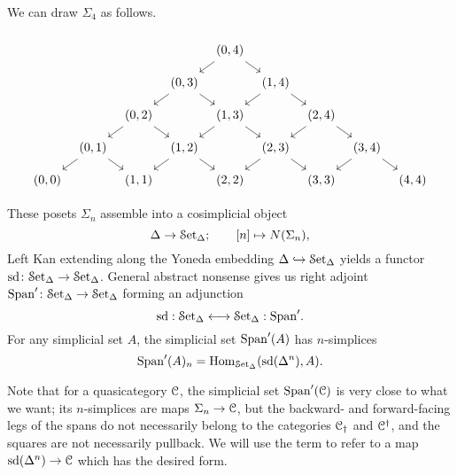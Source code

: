 \documentclass[main.tex]{subfiles}
\begin{document}
\begin{example}
  \label{eg:sigma_4}
  We can draw $\Sigma_{4}$ as follows.
  \begin{equation*}
    \begin{tikzcd}[column sep=tiny, row sep=small]
      \\
      &&&& {(0, 4)}
      \arrow[dl]
      \arrow[dr]
      \\
      &&& {(0, 3)}
      \arrow[dl]
      \arrow[dr]
      && {(1, 4)}
      \arrow[dl]
      \arrow[dr]
      \\
      && {(0, 2)}
      \arrow[dl]
      \arrow[dr]
      && {(1, 3)}
      \arrow[dl]
      \arrow[dr]
      && {(2, 4)}
      \arrow[dl]
      \arrow[dr]
      \\
      & {(0, 1)}
      \arrow[dl]
      \arrow[dr]
      && {(1, 2)}
      \arrow[dl]
      \arrow[dr]
      && {(2, 3)}
      \arrow[dl]
      \arrow[dr]
      && {(3, 4)}
      \arrow[dl]
      \arrow[dr]
      \\
      {(0, 0)}
      && {(1, 1)}
      && {(2, 2)}
      && {(3, 3)}
      && {(4, 4)}
    \end{tikzcd}
  \end{equation*}
\end{example}

These posets $\Sigma_{n}$ assemble into a cosimplicial object 
\begin{equation*}
  \Delta \to \mathcal{S}\mathrm{et}_{\Delta};\qquad [n] \mapsto N(\Sigma_{n}),
\end{equation*}
Left Kan extending along the Yoneda embedding $\Delta \hookrightarrow \mathcal{S}\mathrm{et}_{\Delta}$ yields a functor $\mathrm{sd}\colon \mathcal{S}\mathrm{et}_{\Delta} \to \mathcal{S}\mathrm{et}_{\Delta}$. General abstract nonsense gives us right adjoint $\mathrm{Span}'\colon \mathcal{S}\mathrm{et}_{\Delta} \to \mathcal{S}\mathrm{et}_{\Delta}$ forming an adjunction
\begin{equation*}
  \mathrm{sd}: \mathcal{S}\mathrm{et}_{\Delta} \longleftrightarrow \mathcal{S}\mathrm{et}_{\Delta} : \mathrm{Span}'.
\end{equation*}
For any simplicial set $A$, the simplicial set $\mathrm{Span}'(A)$ has $n$-simplices
\begin{equation*}
  \mathrm{Span}'(A)_{n} = \mathrm{Hom}_{\mathcal{S}\mathrm{et}_{\Delta}}(\mathrm{sd}(\Delta^{n}), A).
\end{equation*}

Note that for a quasicategory $\mathcal{C}$, the simplicial set $\mathrm{Span}'(\mathcal{C})$ is very close to what we want; its $n$-simplices are maps $\Sigma_{n} \to \mathcal{C}$, but the backward- and forward-facing legs of the spans do not necessarily belong to the categories $\mathcal{C}_{\dagger}$ and $\mathcal{C}^{\dagger}$, and the squares are not necessarily pullback. We will use the term to refer to a map $\mathrm{sd}(\Delta^{n}) \to \mathcal{C}$ which has the desired form.
\end{document}
